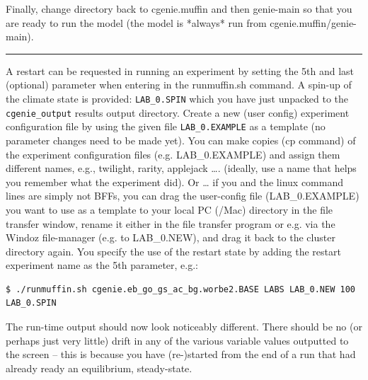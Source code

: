 \documentclass[11pt,fleqn]{book} %
\begin{document}
Finally, change directory back to cgenie.muffin and then genie-main so that you are ready to run the model (the model is *always* run from cgenie.muffin/genie-main).

\vspace{1mm}
\noindent\rule{4cm}{0.1mm}
\vspace{2mm}

\noindent A restart can be requested in running an experiment by setting the 5th and last (optional) parameter when entering in the runmuffin.sh command. A spin-up of the climate state is provided: \texttt{LAB\_0.SPIN} which you have just unpacked to the \texttt{cgenie\_output} results output directory.
Create a new (user config) experiment configuration file by using the given file \texttt{LAB\_0.EXAMPLE} as a template (no parameter changes need to be made yet). You can make copies (cp command) of the experiment configuration files (e.g. LAB\_0.EXAMPLE) and assign them different names, e.g., twilight, rarity, applejack …. (ideally, use a name that helps you remember what the experiment did). Or … if you and the linux command lines are simply not BFFs, you can drag the user-config file (\textsf{\footnotesize LAB\_0.EXAMPLE}) you want to use as a template to your local PC (/Mac) directory in the file transfer window, rename it either in the file transfer program or e.g. via the Windoz file-manager (e.g. to LAB\_0.NEW), and drag it back to the cluster directory again.
You specify the use of the restart state by adding the restart experiment name as the 5th parameter, e.g.:

\small\begin{verbatim}
$ ./runmuffin.sh cgenie.eb_go_gs_ac_bg.worbe2.BASE LABS LAB_0.NEW 100 LAB_0.SPIN
\end{verbatim}\normalsize

The run-time output should now look noticeably different. There should be no (or perhaps just very little) drift in any of the various variable values outputted to the screen – this is because you have (re-)started from the end of a run that had already ready an equilibrium, steady-state.


\cleardoublepage

\end{document}
